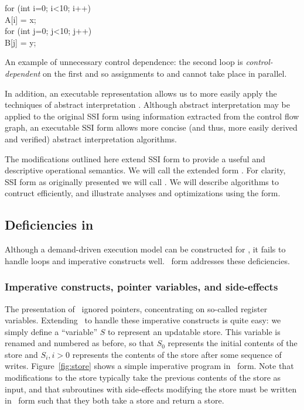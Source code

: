 \documentclass[12pt,titlepage,twoside]{article}
\begin{document}
\begin{myfigure}[t]
\begin{samplecode}
for (int i=0; i<10; i++)\\
\>A[i] = x;\\
for (int j=0; j<10; j++)\\
\>B[j] = y;\\
\end{samplecode}
\caption[An example of unnecessary control dependence.]
{An example of unnecessary control dependence: the second loop
is \emph{control-dependent} on the first and so assignments to
 and  cannot take place in parallel.}
\label{fig:ctrldep}
\end{myfigure}

In addition, an executable representation allows us to more easily
apply the techniques of abstract interpretation \cite{pingali90:dfg}.
Although abstract interpretation may be applied to the original SSI
form using information extracted from the control flow graph, an
executable SSI form allows more concise (and thus, more easily derived
and verified) abstract interpretation algorithms.

The modifications outlined here extend SSI form to
provide a useful and descriptive operational semantics.  We will call
the extended form \ssiplus.  For clarity, SSI form as originally
presented we will call \ssizero.  We will describe algorithms to
contruct \ssiplus{} efficiently, and illustrate analyses and
optimizations using the form.

\subsection{Deficiencies in \ssizero}
Although a demand-driven execution model can be constructed for
\ssizero,  it fails to handle loops and imperative
constructs well. \ssiplus\ form addresses these deficiencies.

\subsubsection{Imperative constructs, pointer variables, and side-effects}
The presentation of \ssizero\ ignored pointers,
concentrating on so-called register variables.  Extending \ssizero\ to
handle these imperative constructs is quite easy: we simply define a
``variable'' $S$ to represent an updatable store.  This variable is
renamed and numbered as before, so that $S_0$ represents the initial
contents of the store and $S_i, i>0$ represents the contents of the
store after some sequence of writes.  Figure~\ref{fig:store} shows a
simple imperative program in \ssiplus\ form.  Note that modifications
to the store typically take the previous contents of the store as
input, and that subroutines with side-effects modifying the store must
be written in \ssiplus\ form such that they both take a store and
return a store.
\end{document}
